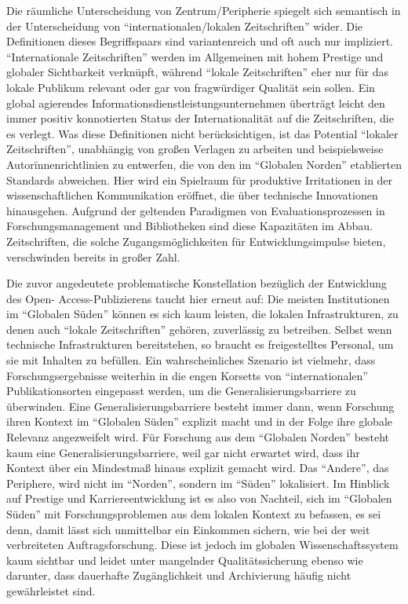 \documentclass[a4paper,
fontsize=11pt,
oneside,
numbers=noperiodatend,
parskip=half-,
bibliography=totoc,
final
]{scrartcl}
\begin{document}
Die räumliche Unterscheidung von Zentrum/Peripherie spiegelt sich
semantisch in der Unterscheidung von \enquote{internationalen/lokalen
Zeitschriften} wider. Die Definitionen dieses Begriffspaars sind
variantenreich und oft auch nur impliziert. \enquote{Internationale
Zeitschriften} werden im Allgemeinen mit hohem Prestige und globaler
Sichtbarkeit verknüpft, während \enquote{lokale Zeitschriften} eher nur
für das lokale Publikum relevant oder gar von fragwürdiger Qualität sein
sollen. Ein global agierendes Informationsdienstleistungsunternehmen
überträgt leicht den immer positiv konnotierten Status der
Internationalität auf die Zeitschriften, die es verlegt. Was diese
Definitionen nicht berücksichtigen, ist das Potential \enquote{lokaler
Zeitschriften}, unabhängig von großen Verlagen zu arbeiten und
beispielsweise Autorïnnenrichtlinien zu entwerfen, die von den im
\enquote{Globalen Norden} etablierten Standards abweichen. Hier wird ein
Spielraum für produktive Irritationen in der wissenschaftlichen
Kommunikation eröffnet, die über technische Innovationen hinausgehen.
Aufgrund der geltenden Paradigmen von Evaluationsprozessen in
Forschungsmanagement und Bibliotheken sind diese Kapazitäten im Abbau.
Zeitschriften, die solche Zugangsmöglichkeiten für Entwicklungsimpulse
bieten, verschwinden bereits in großer Zahl.

Die zuvor angedeutete problematische Konstellation bezüglich der
Entwicklung des Open- \linebreak Access-Publizierens taucht hier erneut auf: Die
meisten Institutionen im \enquote{Globalen Süden} können es sich kaum
leisten, die lokalen Infrastrukturen, zu denen auch \enquote{lokale
Zeitschriften} gehören, zuverlässig zu betreiben. Selbst wenn technische
Infrastrukturen bereitstehen, so braucht es freigestelltes Personal, um
sie mit Inhalten zu befüllen. Ein wahrscheinliches Szenario ist
vielmehr, dass Forschungsergebnisse weiterhin in die engen Korsetts von
\enquote{internationalen} Publikationsorten eingepasst werden, um die
Generalisierungsbarriere zu überwinden. Eine Generalisierungsbarriere
besteht immer dann, wenn Forschung ihren Kontext im \enquote{Globalen
Süden} explizit macht und in der Folge ihre globale Relevanz
angezweifelt wird. Für Forschung aus dem \enquote{Globalen Norden}
besteht kaum eine Generalisierungsbarriere, weil gar nicht erwartet
wird, dass ihr Kontext über ein Mindestmaß hinaus explizit gemacht wird.
Das \enquote{Andere}, das Periphere, wird nicht im \enquote{Norden},
sondern im \enquote{Süden} lokalisiert. Im Hinblick auf Prestige und
Karriereentwicklung ist es also von Nachteil, sich im \enquote{Globalen
Süden} mit Forschungsproblemen aus dem lokalen Kontext zu befassen, es
sei denn, damit lässt sich unmittelbar ein Einkommen sichern, wie bei
der weit verbreiteten Auftragsforschung. Diese ist jedoch im globalen
Wissenschaftssystem kaum sichtbar und leidet unter mangelnder
Qualitätssicherung ebenso wie darunter, dass dauerhafte Zugänglichkeit
und Archivierung häufig nicht gewährleistet sind.
\end{document}
